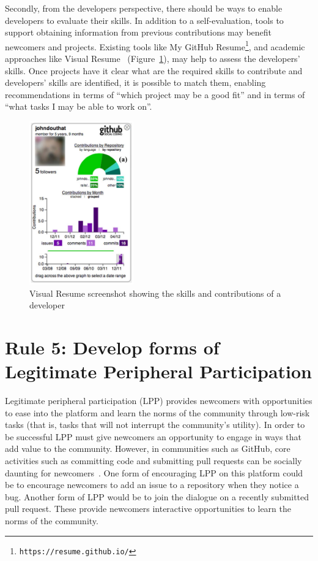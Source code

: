 \documentclass[10pt,letterpaper]{article}
\newcommand{\rulemajor}[1]{\section{#1}}
\newcommand{\withurl}[2]{{#1}\footnote{{\texttt{#2}}}}
\begin{document}
Secondly,
from the developers perspective,
there should be ways to enable developers to evaluate their skills.
In addition to a self-evaluation,
tools to support obtaining information from previous contributions may benefit newcomers and projects.
Existing tools like \withurl{My GitHub Resume}{https://resume.github.io/},
and academic approaches like Visual Resume~\cite{sarma2016} (Figure~\ref{fig:visualResume}),
may help to assess the developers' skills.
Once projects have it clear what are the required skills to contribute and developers' skills are identified,
it is possible to match them,
enabling recommendations in terms of ``which project may be a good fit''
and in terms of ``what tasks I may be able to work on''.


 \begin{figure}[hbt]
	\centering
   \includegraphics[width=4.5cm]{contributions.png}
	\caption{Visual Resume screenshot showing the skills and contributions of a developer}
	\label{fig:visualResume}
\end{figure}


\rulemajor{Rule 5: Develop forms of Legitimate Peripheral Participation}

Legitimate peripheral participation (LPP) provides newcomers with opportunities to ease into the platform and learn the norms of the community through low-risk tasks
(that is, tasks that will not interrupt the community's utility).
In order to be successful LPP must give newcomers an opportunity to engage in ways that add value to the community.
However,
in communities such as GitHub,
core activities such as committing code and submitting pull requests can be socially daunting for newcomers~\cite{steinmacher2015}.
One form of encouraging LPP on this platform could be to encourage newcomers to add an issue to a repository when they notice a bug.
Another form of LPP would be to join the dialogue on a recently submitted pull request.
These provide newcomers interactive opportunities to learn the norms of the community. 
\end{document}
